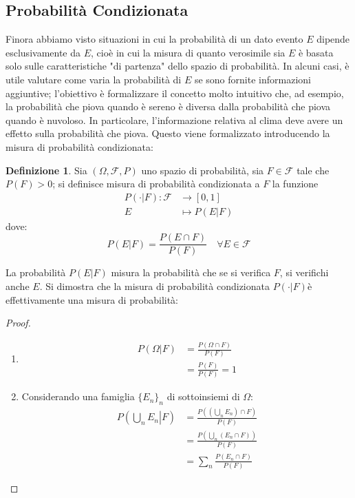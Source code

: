 \documentclass{article}
\theoremstyle{plain}
\theoremstyle{definition}
\newtheorem{definizione}{Definizione}[section]
\theoremstyle{remark}
\begin{document}
\subsection{Probabilità Condizionata} %
\label{sub:probabilità_condizionata}
Finora abbiamo visto situazioni in cui la probabilità di un dato evento $E$ dipende esclusivamente da $E$, cioè in cui la misura di quanto verosimile sia $E$ è basata solo sulle caratteristiche "di partenza" dello spazio di probabilità. In alcuni casi, è utile valutare come varia la probabilità di $E$ se sono fornite informazioni aggiuntive; l'obiettivo è formalizzare il concetto molto intuitivo che, ad esempio, la probabilità che piova quando è sereno è diversa dalla probabilità che piova quando è nuvoloso. In particolare, l'informazione relativa al clima deve avere un effetto sulla probabilità che piova. Questo viene formalizzato introducendo la misura di probabilità condizionata:
\begin{definizione}
	Sia $(\Omega,\mathscr{F},P)$ uno spazio di probabilità, sia $F\in\mathscr{F}$ tale che $P(F)>0$; si definisce misura di probabilità condizionata a $F$ la funzione
	\begin{align*}
		P(\cdot|F):\mathscr{F}&\to[0,1]\\
		E&\mapsto P(E|F)
	\end{align*}
	dove:
	\begin{equation*}
		P(E|F)=\frac{P(E\cap F)}{P(F)}\quad \forall E\in\mathscr{F}
	\end{equation*}
\end{definizione}
La probabilità $P(E|F)$ misura la probabilità che se si verifica $F$, si verifichi anche $E$. Si dimostra che la misura di probabilità condizionata $P(\cdot|F)$è effettivamente una misura di probabilità:
\begin{proof}
	\begin{enumerate}
		\item 
		\begin{align*}
			P(\Omega|F)&=\frac{P(\Omega\cap F)}{P(F)}\\
			&=\frac{P(F)}{P(F)}=1
		\end{align*}
		\item Considerando una famiglia $\{E_n\}_n$ di sottoinsiemi di $\Omega$:
		\begin{align*}
			P\left(\left.\bigcup_n E_n\right|F \right)&=\frac{P\left(\left(\bigcup_n E_n\right)\cap F\right)}{P(F)}\\
			&=\frac{P\left(\bigcup_n (E_n\cap F)\right)}{P(F)}\\
			&=\sum_n \frac{P(E_n\cap F)}{P(F)}
		\end{align*}
	\end{enumerate}
	\qedhere
\end{proof}
\end{document}
